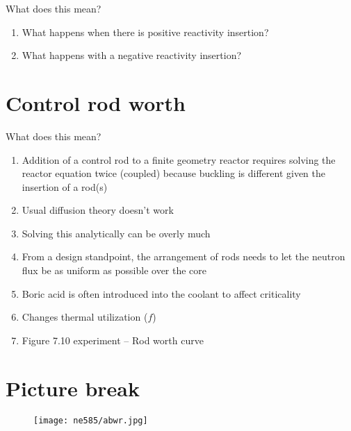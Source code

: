 \documentclass[aspectratio=1610,pdftex,dvipsnames,compress,xcolor={dvipsnames}]{beamer}
\begin{document}
\addtocounter{framenumber}{-1} 
\begin{frame}{What does this mean?}
    \begin{enumerate}[series=outerlist,topsep=0pt,itemsep=21pt,leftmargin=*,label=(\arabic*)]
        \item[]What happens when there is positive reactivity insertion?
        \item[]What happens with a negative reactivity insertion?
    \end{enumerate}
\end{frame}


\section{Control rod worth}


\addtocounter{framenumber}{-1} 
\begin{frame}{What does this mean?}
    \begin{enumerate}[series=outerlist,topsep=0pt,itemsep=18pt,leftmargin=*,label=(\arabic*)]
        \item[]Addition of a control rod to a finite geometry reactor requires solving the reactor equation twice (coupled) because buckling is different given the insertion of a rod(s)
        \item[]Usual diffusion theory doesn't work
        \item[]Solving this analytically can be overly much
        \item[]From a design standpoint, the arrangement of rods needs to let the neutron flux be as uniform as possible over the core
        \item[]Boric acid is often introduced into the coolant to affect criticality
        \item[]Changes thermal utilization ($f$)
        \item[]Figure 7.10 experiment -- Rod worth curve
    \end{enumerate}
\end{frame}


\section{Picture break}


\addtocounter{framenumber}{-1} 
\begin{frame}{}
    \begin{figure}
        \centering
        \texttt{[image: ne585/abwr.jpg]}
    \end{figure}
\end{frame}
\end{document}
